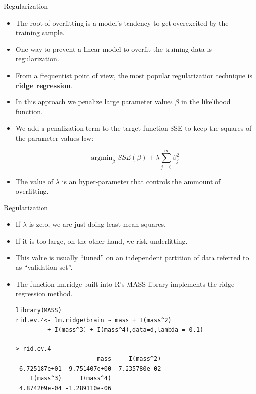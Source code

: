 \documentclass[handout]{beamer}
\begin{document}
\begin{frame}{Regularization}
\scriptsize{

\begin{itemize}

\item The root of overfitting is a model's tendency to get overexcited by the training sample.

\item One way to prevent a linear model to overfit the training data is regularization.

\item  From a frequentist point of view, the most popular regularization technique is \textbf{ridge regression}.


\item In this approach we penalize large parameter values $\beta$ in the likelihood function.

\item We add a penalization term to the target function SSE to keep  the squares of the parameter values low:

\begin{equation}
 \operatorname{argmin}_{\beta} SSE(\beta) + \lambda \sum_{j=0}^m\beta_j^2 
\end{equation} 

\item The value of $\lambda$ is an hyper-parameter that controls the ammount of overfitting.



\end{itemize}


} 
\end{frame}


\begin{frame}[fragile]{Regularization}
\scriptsize{

\begin{itemize}

\item If $\lambda$ is zero, we are just doing least mean squares.

\item If it is too large, on the other hand, we risk underfitting.

\item This value is usually ``tuned'' on an independent partition of data referred to as ``validation set''. 

\item The function lm.ridge built into R's MASS library implements the ridge regression method. 

\begin{verbatim}
library(MASS)
rid.ev.4<- lm.ridge(brain ~ mass + I(mass^2)
         + I(mass^3) + I(mass^4),data=d,lambda = 0.1) 

> rid.ev.4
                       mass     I(mass^2) 
 6.725187e+01  9.751407e+00  7.235780e-02 
    I(mass^3)     I(mass^4) 
 4.874209e-04 -1.289110e-06         
\end{verbatim}



\end{itemize}


} 
\end{frame}
\end{document}
